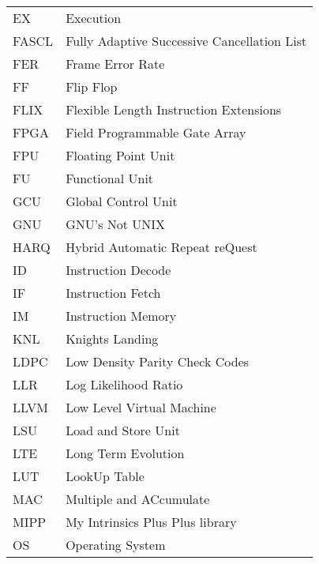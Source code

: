 \begin{center}
\begin{longtable}{ p{}  p{} }
EX        & Execution                                              \\
FASCL     & Fully Adaptive Successive Cancellation List            \\
FER       & Frame Error Rate                                       \\
FF        & Flip Flop                                              \\
FLIX      & Flexible Length Instruction Extensions                 \\
FPGA      & Field Programmable Gate Array                          \\
FPU       & Floating Point Unit                                    \\
FU        & Functional Unit                                        \\
GCU       & Global Control Unit                                    \\
GNU       & GNU’s Not UNIX                                         \\
HARQ      & Hybrid Automatic Repeat reQuest                        \\
ID        & Instruction Decode                                     \\
IF        & Instruction Fetch                                      \\
IM        & Instruction Memory                                     \\
KNL       & Knights Landing                                        \\
LDPC      & Low Density Parity Check Codes                         \\
LLR       & Log Likelihood Ratio                                   \\
LLVM      & Low Level Virtual Machine                              \\
LSU       & Load and Store Unit                                    \\
LTE       & Long Term Evolution                                    \\
LUT       & LookUp Table                                           \\
MAC       & Multiple and ACcumulate                                \\
MIPP      & My Intrinsics Plus Plus library                        \\
OS        & Operating System                                       \\

\end{longtable}
\end{center}
